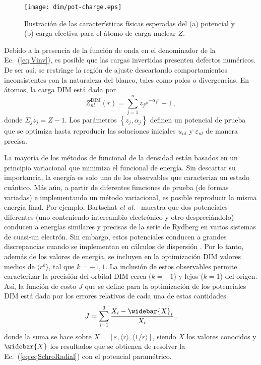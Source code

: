 \begin{figure}[t]
\centering
\texttt{[image: dim/pot-charge.eps]}
\caption[Características físicas del potencial y carga efectiva.]
{Ilustración de las características físicas esperadas del (a) potencial 
y (b) carga efectiva para el átomo de carga nuclear $Z$.}
\label{fig:potycharge}
\end{figure}

Debido a la presencia de la función de onda en el denominador de la 
Ec.~(\ref{eq:Vinv}), es posible que las cargas invertidas presenten 
defectos numéricos. De ser así, se restringe la región de ajuste 
descartando comportamientos inconsistentes con la naturaleza del blanco,
tales como polos o divergencias. En átomos, la carga DIM está dada por
\begin{equation}
Z_{nl}^{\mathrm{DIM}}(r)= \sum_{j=1}^{n} z_j e^{-\alpha_j r}+1 \,,
\label{eq:atomzDIM}
\end{equation}
donde $\Sigma_j z_j=Z-1$. Los parámetros $\left\{z_j,\alpha_j\right\}$ 
definen un potencial de prueba que se optimiza hasta reproducir las 
soluciones iniciales $u_{nl}$ y $\varepsilon_{nl}$ de manera precisa. 

La mayoría de los métodos de funcional de la densidad están basados en 
un principio variacional que minimiza el funcional de energía. Sin 
descartar su importancia, la energía es solo uno de los observables que 
caracteriza un estado cuántico. Más aún, a partir de diferentes 
funciones de prueba (de formas variadas) e implementando un método 
variacional, es posible reproducir la misma energía final. Por ejemplo, 
Bartschat \textit{et al.}~\cite{Albright:93,Bartschat:96} muestra que 
dos potenciales diferentes (uno conteniendo intercambio electrónico y 
otro despreciándolo) conducen a energías similares y precisas de la 
serie de Rydberg en varios sistemas de cuasi-un electrón. Sin embargo, 
estos potenciales conducen a grandes discrepancias cuando se implementan 
en cálculos de dispersión \cite{BartschatBray:96}. Por lo tanto, además 
de los valores de energía, se incluyen en la optimización DIM valores 
medios de $\langle r^k \rangle$, tal que $k=-1,1$. La inclusión de estos 
observables permite caracterizar la precisión del orbital DIM cerca 
($k=-1$) y lejos ($k=1$) del origen. Así, la función de costo $J$ que se 
define para la optimización de los potenciales DIM está dada por los 
errores relativos de cada una de estas cantidades
\begin{equation}
J=\sum_{i=1}^3 \frac{X_i-\widebar{X}_i}{X_i}\,,
\label{eq:fncosto-dim}
\end{equation}
donde la suma se hace sobre 
$X=\left[\varepsilon,\langle r \rangle,\langle 1/r \rangle\right]$, 
siendo $X$ los valores conocidos y $\widebar{X}$ los resultados que se 
obtienen de resolver la Ec.~(\ref{eq:eqSchroRadial}) con el potencial 
paramétrico. 

